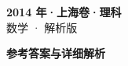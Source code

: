 \documentclass[zihao=-4, a4paper]{ctexart}
\begin{document}
\begin{center}
  {\Large\bfseries 2014 年·上海卷·理科}\\[4pt]
  {\large 数学 · 解析版}
\end{center}
\medskip
{}

\clearpage
{}
\begin{center}{\Large\bfseries 参考答案与详细解析}\end{center}
\medskip

\end{document}
